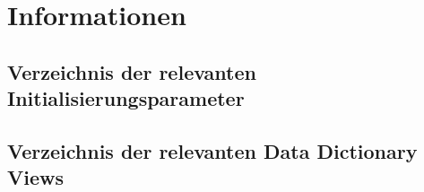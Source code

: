     \section{Informationen}
      \subsection{Verzeichnis der relevanten Initialisierungsparameter}
        \begin{literaturinternet}
          \item \cite{REFRN10285}
          \item \cite{REFRN10256}
          \item \cite{REFRN10202}
          \item \cite{REFRN10298}
          \item \cite{REFRN10272}
          \item \cite{REFRN10270}
          \item \cite{REFRN10294}
        \end{literaturinternet}
      \subsection{Verzeichnis der relevanten Data Dictionary Views}
        \begin{literaturinternet}
          \item \cite{REFRN30438}
          \item \cite{REFRN30439}
        \end{literaturinternet}
\clearpage